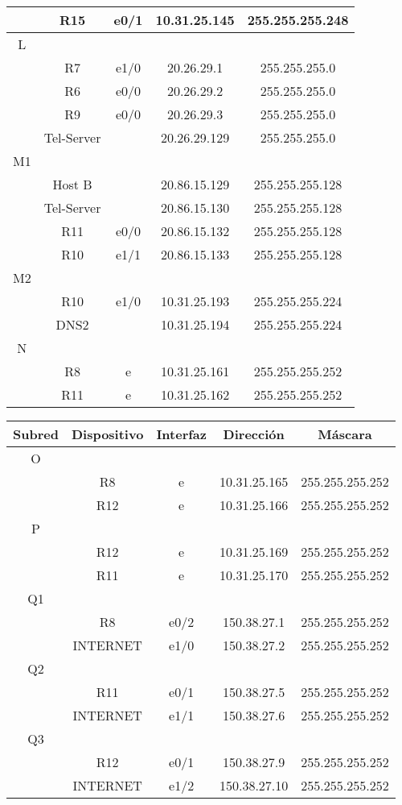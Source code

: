\documentclass[12pt,a4paper,spanish]{article}
\begin{document}
\begin{tabular}{|c|c|c|c|c|}
	\hline
	  & R15 & e0/1 & 10.31.25.145 & 255.255.255.248 \\
	\hline
	\hline
	L & & & & \\
	\hline
	  & R7 & e1/0 & 20.26.29.1 & 255.255.255.0 \\
	\hline
	  & R6 & e0/0 & 20.26.29.2 & 255.255.255.0 \\
	\hline
	  & R9 & e0/0 & 20.26.29.3 & 255.255.255.0 \\
	\hline
	  & Tel-Server & & 20.26.29.129 & 255.255.255.0 \\
	\hline
	\hline
	M1 & & & & \\
	\hline
	  & Host B & & 20.86.15.129 & 255.255.255.128 \\
	\hline
	  & Tel-Server & & 20.86.15.130 & 255.255.255.128 \\
	\hline
	  & R11 & e0/0 & 20.86.15.132 & 255.255.255.128 \\
	\hline
	  & R10 & e1/1 & 20.86.15.133 & 255.255.255.128 \\
	\hline
	\hline
	M2 & & & & \\
	\hline
	  & R10 & e1/0 & 10.31.25.193 & 255.255.255.224 \\
	\hline
	  & DNS2 & & 10.31.25.194 & 255.255.255.224 \\
	\hline
	\hline
	N & & & & \\
	\hline
	  & R8 & e & 10.31.25.161 & 255.255.255.252 \\
	\hline
	  & R11 & e & 10.31.25.162 & 255.255.255.252 \\
	\hline
\end{tabular}
\newpage
\begin{tabular}{|c|c|c|c|c|}
	\hline
	Subred & Dispositivo & Interfaz & Dirección & Máscara\\
	\hline
	\hline
	O & & & & \\
	\hline
	  & R8 & e & 10.31.25.165 & 255.255.255.252 \\
	\hline
	  & R12 & e & 10.31.25.166 & 255.255.255.252 \\
	\hline
	\hline
	P & & & & \\
	\hline
	  & R12 & e & 10.31.25.169 & 255.255.255.252 \\
	\hline
	  & R11 & e & 10.31.25.170 & 255.255.255.252 \\
	\hline
	Q1 & & & & \\
	\hline
	  & R8 & e0/2 & 150.38.27.1 & 255.255.255.252 \\
	\hline
	  & INTERNET & e1/0 & 150.38.27.2 & 255.255.255.252 \\
	\hline
	Q2 & & & & \\
	\hline
	  & R11 & e0/1 & 150.38.27.5 & 255.255.255.252 \\
	\hline
	  & INTERNET & e1/1 & 150.38.27.6 & 255.255.255.252 \\
	\hline
	Q3 & & & & \\
	\hline
	  & R12 & e0/1 & 150.38.27.9 & 255.255.255.252 \\
	\hline
	  & INTERNET & e1/2 & 150.38.27.10 & 255.255.255.252 \\
	\hline
\end{tabular}
\end{document}
